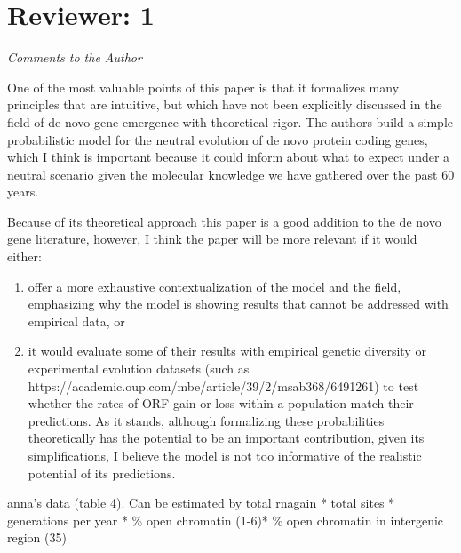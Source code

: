 \documentclass[12pt,a4paper]{article}
\begin{document}
\onehalfspacing 

\section*{Reviewer: 1}

{\itshape Comments to the Author

One of the most valuable points of this paper is that it formalizes many principles that are intuitive, but which have not been explicitly discussed in the field of de novo gene emergence with theoretical rigor. The authors build a simple probabilistic model for the neutral evolution of de novo protein coding genes, which I think is important because it could inform about what to expect under a neutral scenario given the molecular knowledge we have gathered over the past 60 years.

Because of its theoretical approach this paper is a good addition to the de novo gene literature, however, I think the paper will be more relevant if it would either:

\begin{enumerate}
\item offer a more exhaustive contextualization of the model and the field, emphasizing why the model is showing results that cannot be addressed with empirical data, or

\item it would evaluate some of their results with empirical genetic diversity or experimental evolution datasets (such as https://academic.oup.com/mbe/article/39/2/msab368/6491261) to test whether the rates of ORF gain or loss within a population match their predictions. As it stands, although formalizing these probabilities theoretically has the potential to be an important contribution, given its simplifications, I believe the model is not too informative of the realistic potential of its predictions.
\end{enumerate}
}

anna's data (table 4). Can be estimated by total rnagain * total sites * generations per year * \% open chromatin (1-6)* \% open chromatin in intergenic region (35) 
\end{document}
